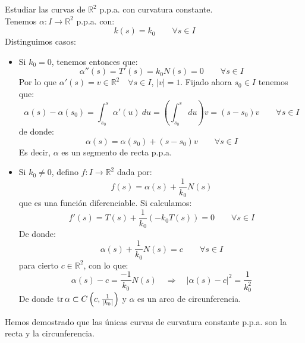 \begin{ejercicio}
    Estudiar las curvas de $\mathbb{R}^2$ p.p.a. con curvatura constante.\\

    \noindent
    Tenemos $\alpha:I\to \mathbb{R}^2$ p.p.a. con:
    \begin{equation*}
        k(s) = k_0\qquad \forall s\in I
    \end{equation*}
    Distinguimos casos:
    \begin{itemize}
        \item Si $k_0 = 0$, tenemos entonces que:
            \begin{equation*}
                \alpha''(s) = T'(s) = k_0N(s) = 0 \qquad \forall s\in I
            \end{equation*}
            Por lo que $\alpha'(s) = v\in \mathbb{R}^2\quad \forall s\in I$, $|v|=1$. Fijado ahora $s_0\in I$ tenemos que:
            \begin{equation*}
                \alpha(s) - \alpha(s_0) = \int_{s_0}^{s} \alpha'(u)~du = \left(\int_{s_0}^{s} ~du \right) v = (s-s_0)v \qquad \forall s\in I
            \end{equation*}
            de donde:
            \begin{equation*}
                \alpha(s) = \alpha(s_0) + (s-s_0)v \qquad \forall s\in I
            \end{equation*}
            Es decir, $\alpha$ es un segmento de recta p.p.a.
        \item Si $k_0\neq 0$, defino $f:I\to \mathbb{R}^2$ dada por:
            \begin{equation*}
                f(s) = \alpha(s) + \frac{1}{k_0}N(s)
            \end{equation*}
            que es una función diferenciable. Si calculamos:
            \begin{equation*}
                f'(s) = T(s) + \frac{1}{k_0}(-k_0T(s)) = 0 \qquad \forall s\in I
            \end{equation*}
            De donde:
            \begin{equation*}
                \alpha(s) + \frac{1}{k_0}N(s) = c \qquad \forall s\in I
            \end{equation*}
            para cierto $c\in \mathbb{R}^2$, con lo que:
            \begin{equation*}
                \alpha(s) - c = \frac{-1}{k_0}N(s) \quad\Longrightarrow\quad |\alpha(s)-c|^2 = \frac{1}{k_0^2}
            \end{equation*}
            De donde $\operatorname{tr}\alpha\subset C\left(c,\frac{1}{|k_0|}\right)$ y $\alpha$ es un arco de circunferencia.
    \end{itemize}
    Hemos demostrado que las únicas curvas de curvatura constante p.p.a. son la recta y la circunferencia.
\end{ejercicio}


